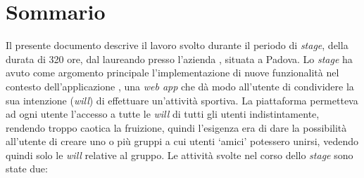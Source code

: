 
\cleardoublepage
{}
{}
\begingroup
\let\clearpage\relax
\let\cleardoublepage\relax
\let\cleardoublepage\relax

\chapter*{Sommario}

Il presente documento descrive il lavoro svolto durante il periodo di
\textit{stage},
della durata di 320 ore, dal laureando \myName presso
l'azienda \myCompany, situata a Padova.
Lo \textit{stage} ha avuto come argomento principale l'implementazione di nuove
funzionalità nel contesto dell'applicazione \productName, una
\textit{web app} che dà modo all'utente di condividere la sua intenzione
(\textit{will}) di effettuare un'attività sportiva.
La piattaforma permetteva ad ogni utente l'accesso a tutte le \textit{will} di tutti gli utenti indistintamente,
rendendo troppo caotica la
fruizione, quindi l'esigenza era di dare la possibilità all'utente
di creare uno o più gruppi a cui utenti \enquote*{amici} potessero unirsi,
vedendo quindi solo le \textit{will} relative al gruppo.
Le attività svolte nel corso dello \textit{stage} sono state due:
